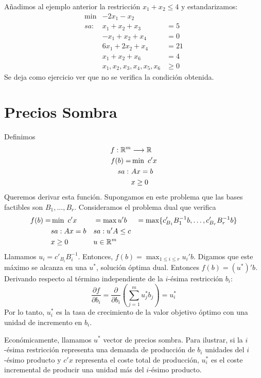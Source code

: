 \documentclass[PM.tex]{subfiles}
\begin{document}
\begin{example}
Añadimos al ejemplo anterior la restricción $x_1+x_2\leq 4$ y estandarizamos:
\[\begin{aligned}
\min & -2x_1-x_2 &\\
sa: & x_1+x_2 +x_3 &= 5\\
    & -x_1+x_2 +x_4 & =0\\
    & 6x_1+2x_2  +x_4 & = 21\\
    & x_1+x_2 +x_6  & = 4\\
    & x_1,x_2,x_3,x_4,x_5,x_6 & \geq 0
\end{aligned}\]
Se deja como ejercicio ver que no se verifica la condición obtenida.
\end{example}

\section{Precios Sombra}
Definimos 
\begin{align*}
f: \mathbb{R}^m& \longrightarrow \mathbb{R}\\
 f(b) = & \min\ c'x\\
  sa:\  & Ax=b\\
  & x\geq 0
\end{align*}
Queremos derivar esta función. Supongamos en este problema que las bases factibles son $B_1,\dots, B_r$. Consideramos el problema dual que verifica
\[\begin{aligned}
 f(b) = & \min\ c'x & & = \max u'b & = \max\{c'_{B_1}B_1^{-1}b,\dots, c'_{B_r}B_r^{-1}b\}\\
        & sa: Ax=b & & sa: u'A\leq c\\
        &  x\geq 0 & & u\in\mathbb{R}^m &
\end{aligned}\]
Llamamos $u_i=c'_{B_i}B_i^{-1}$. Entonces, $f(b)=\max_{1\leq i\leq r}u_i'b$. Digamos que este máximo se alcanza en una $u^*$, solución óptima dual.
Entonces $f(b)=(u^*)' b$. Derivando respecto al término independiente de la $i$-ésima restricción $b_i$:
\[\frac{\partial f}{\partial b_i}=\frac{\partial }{\partial b_i}\left(\sum_{j=1}^m u^*_jb_j\right)=u^*_i\]
Por lo tanto, $u^*_i$ es la tasa de crecimiento de la valor objetivo óptimo con una unidad de incremento en $b_i$.

Económicamente, llamamos $u^*$ vector de precios sombra. Para ilustrar, si la $i$-ésima restricción representa una demanda de producción de $b_i$ unidades del $i$-ésimo producto y $c'x$ representa el coste total de producción, $u^*_i$ es el coste incremental de producir una unidad más del $i$-ésimo producto.
\end{document}
